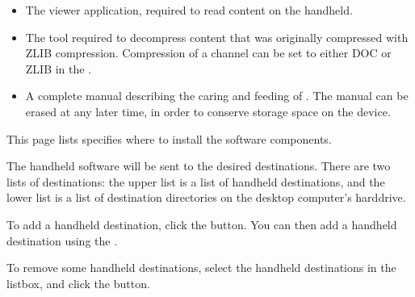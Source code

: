 \begin{itemize}
  \item {} The viewer application, 
  required to read \brandingapplicationsuitename content on the handheld.

  \item {} The tool required to
  decompress \brandingapplicationsuitename content that was originally compressed with ZLIB
  compression. Compression of a channel can be set to either DOC or ZLIB in 
  the 
  \helpignore{\ref{sec:pd-channel-dialog-output-tab}}
  .

  \item {} A complete manual 
  describing the caring and feeding of \brandingapplicationsuitename. The manual can be erased at 
  any later time, in order to conserve storage space on the device.
\end{itemize}


This page lists specifies where to install the software components.

The handheld software will be sent to the desired destinations. There are two 
lists of destinations: the upper list is a list of handheld destinations, and
the lower list is a list of destination directories on the desktop computer's
harddrive.

To add a handheld destination, click the  
button. You can then add a handheld destination using the
\helpignore{\ref{sec:pd-handheld-dest-dialog}}
.

To remove some handheld destinations, select the handheld destinations in 
the listbox, and click the  button.

